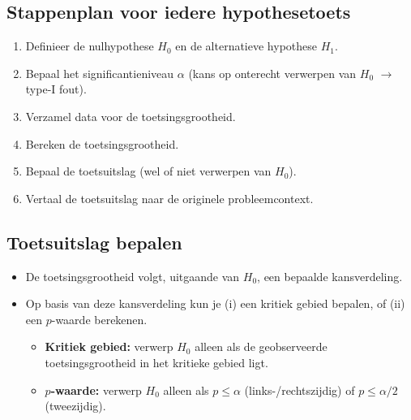 \subsection*{Stappenplan voor iedere hypothesetoets}
\begin{enumerate}
    \item Definieer de nulhypothese $H_0$ en de alternatieve hypothese $H_1$.
    \item Bepaal het significantieniveau $\alpha$ (kans op onterecht verwerpen van $H_0$ $\rightarrow$ type-I fout).
    \item Verzamel data voor de toetsingsgrootheid.
    \item Bereken de toetsingsgrootheid.
    \item Bepaal de toetsuitslag (wel of niet verwerpen van $H_0$).
    \item Vertaal de toetsuitslag naar de originele probleemcontext.
\end{enumerate}

\newpage 

\subsection*{Toetsuitslag bepalen}
\begin{itemize}
    \item De toetsingsgrootheid volgt, uitgaande van $H_0$, een bepaalde kansverdeling.
    \item Op basis van deze kansverdeling kun je (i) een kritiek gebied bepalen, of (ii) een $p$-waarde berekenen.
    \begin{itemize}
        \item \textbf{Kritiek gebied:} verwerp $H_0$ alleen als de geobserveerde toetsingsgrootheid in het kritieke gebied ligt.
        \item \textbf{$p$-waarde:} verwerp $H_0$ alleen als $p \le \alpha$ (links-/rechtszijdig) of $p \le \alpha / 2$ (tweezijdig).
    \end{itemize}
\end{itemize}

